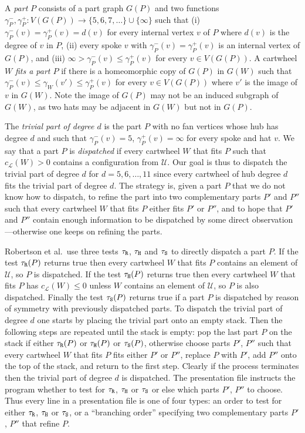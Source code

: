 \documentclass[11pt]{article}
\newcommand{\mcal}{\mathcal}
\newcommand{\gm}{\gamma}
\begin{document}
A \emph{part} $P$ consists of a part graph $G(P)$ and two functions $\gm_P^-, \gm_P^+: V(G(P)) \rightarrow \{5, 6, 7, \ldots \} \cup \{ \infty \}$ such that (i) $\gm_P^-(v) = \gm_P^+(v) = d(v)$ for every internal vertex $v$ of $P$ where $d(v)$ is the degree of $v$ in $P$, (ii) every spoke $v$ with $\gm_P^-(v) = \gm_P^+(v)$ is an internal vertex of $G(P)$, and (iii) $\infty > \gm_P^-(v) \leq \gm_P^+(v)$ for every $v \in V(G(P))$. A cartwheel $W$ \emph{fits a part $P$} if there is a homeomorphic copy of $G(P)$ in $G(W)$ such that 
$\gm_P^-(v) \leq \gm_W(v') \leq \gm_P^+(v)$ for every $v \in V(G(P))$ where $v'$ is the image of $v$ in $G(W)$. Note the image of $G(P)$ may not be an induced subgraph of $G(W)$, as two hats may be adjacent in $G(W)$ but not in $G(P)$.

The \emph{trivial part of degree $d$} is the part $P$ with no fan vertices whose hub has degree $d$ and such that $\gm_P^-(v) = 5$, $\gm_P^+(v)= \infty$ for every spoke and hat $v$. We say that a part $P$ is \emph{dispatched} if every cartwheel $W$ that fits $P$ such that $c_{\mcal{L}}(W) > 0$ contains a configuration from $\mcal{U}$. Our goal is thus to dispatch the trivial part of degree $d$ for $d = 5, 6, \dots, 11$ since every cartwheel of hub degree $d$ fits the trivial part of degree $d$. The strategy is, given a part $P$ that we do not know how to dispatch, to refine the part into two complementary parts $P'$ and $P''$ such that every cartwheel $W$ that fits $P$ either fits $P'$ or $P''$, and to hope that $P'$ and $P''$ contain enough information to be dispatched by some direct observation---otherwise one keeps on refining the parts. 

\newcommand{\tone}{\tau_{\tt R}}
\newcommand{\ttwo}{\tau_{\tt H}}
\newcommand{\tthree}{\tau_{\tt S}}

Robertson et al.~use three tests $\tone$, $\ttwo$ and $\tthree$ to directly dispatch a part $P$. If the test $\tone(P)$ returns true then every cartwheel $W$ that fits $P$ contains an element of $\mcal{U}$, so $P$ is dispatched. If the test $\ttwo(P)$ returns true then every cartwheel $W$ that fits $P$ has $c_{\mcal{L}}(W) \leq 0$ unless $W$ contains an element of $\mcal{U}$, so $P$ is also dispatched. Finally the test $\tthree(P)$ returns true if a part $P$ is dispatched by reason of symmetry with previously dispatched parts. 
To dispatch the trivial part of degree $d$ one starts by placing the trivial part onto an empty stack. 
Then the following steps are repeated until the stack is empty: pop the last part $P$ on the stack if either $\tone(P)$ or $\ttwo(P)$ or $\tthree(P)$, otherwise choose parts $P'$, $P''$ 
such that every cartwheel $W$ that fits $P$ fits either $P'$ or $P''$, replace $P$ with $P'$, add $P''$ onto the top of the stack, and return to the first step. Clearly if the process terminates then the trivial part of degree $d$ is dispatched. The presentation file instructs the program whether to test for $\tone$, $\ttwo$ or $\tthree$ or else which parts $P'$, $P''$ to choose. Thus every line in a presentation file is one of four types: an order to test for either $\tone$, $\ttwo$ or $\tthree$, or a ``branching order'' specifying two complementary parts $P'$, $P''$ that refine $P$.
\end{document}
